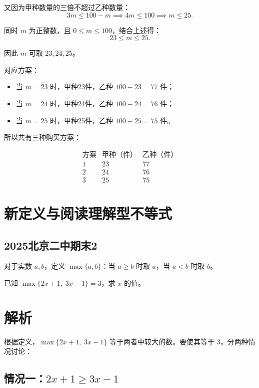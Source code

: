 又因为甲种数量的三倍不超过乙种数量：
\[
3m \le 100 - m \implies 4m \le 100 \implies m \le 25.
\]

同时 \(m\) 为正整数，且 \(0 \le m \le 100\)，结合上述得：
\[
23 \le m \le 25.
\]

因此 \(m\) 可取 \(23, 24, 25\)。

对应方案：

\begin{itemize}
    \item 当 \(m=23\) 时，甲种23件，乙种 \(100-23=77\) 件；
    \item 当 \(m=24\) 时，甲种24件，乙种 \(100-24=76\) 件；
    \item 当 \(m=25\) 时，甲种25件，乙种 \(100-25=75\) 件。
\end{itemize}

所以共有三种购买方案：

\[
\boxed{
\begin{array}{c|c|c}
\text{方案} & \text{甲种（件）} & \text{乙种（件）} \\
\hline
1 & 23 & 77 \\
2 & 24 & 76 \\
3 & 25 & 75
\end{array}
}
\]

\section{新定义与阅读理解型不等式}

\subsection{2025北京二中期末2}
\label{2025北京二中期末2}

对于实数 \(a, b\)，定义 \(\max\{a, b\}\)：当 \(a \geq b\) 时取 \(a\)，当 \(a < b\) 时取 \(b\)。

已知 \(\max\{2x + 1,\; 3x - 1\} = 3\)，求 \(x\) 的值。

\section*{解析}

根据定义，\(\max\{2x+1,\;3x-1\}\) 等于两者中较大的数。要使其等于 \(3\)，分两种情况讨论：

\subsection*{情况一：\(2x+1 \geq 3x-1\)}


